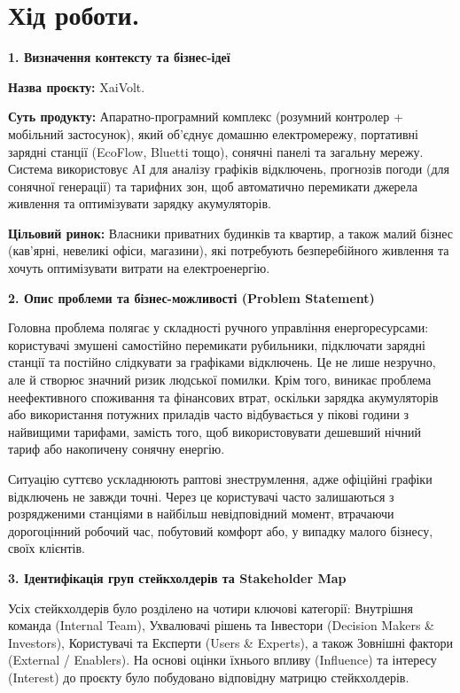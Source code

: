\documentclass[14pt, a4paper]{extreport}
\begin{document}
	\section*{Хід роботи.}
	
	\textbf{1. Визначення контексту та бізнес-ідеї}
	
	\textbf{Назва проєкту:} XaiVolt. 
	
	\textbf{Суть продукту:} Апаратно-програмний комплекс (розумний контролер + мобільний застосунок), який об'єднує домашню електромережу, портативні зарядні станції (EcoFlow, Bluetti тощо), сонячні панелі та загальну мережу. Система використовує AI для аналізу графіків відключень, прогнозів погоди (для сонячної генерації) та тарифних зон, щоб автоматично перемикати джерела живлення та оптимізувати зарядку акумуляторів.
	
	\textbf{Цільовий ринок:} Власники приватних будинків та квартир, а також малий бізнес (кав'ярні, невеликі офіси, магазини), які потребують безперебійного живлення та хочуть оптимізувати витрати на електроенергію.
	
	\textbf{2. Опис проблеми та бізнес-можливості (Problem Statement)}
	
	Головна проблема полягає у складності ручного управління енергоресурсами: користувачі змушені самостійно перемикати рубильники, підключати зарядні станції та постійно слідкувати за графіками відключень. Це не лише незручно, але й створює значний ризик людської помилки. Крім того, виникає проблема неефективного споживання та фінансових втрат, оскільки зарядка акумуляторів або використання потужних приладів часто відбувається у пікові години з найвищими тарифами, замість того, щоб використовувати дешевший нічний тариф або накопичену сонячну енергію. 
	
	Ситуацію суттєво ускладнюють раптові знеструмлення, адже офіційні графіки відключень не завжди точні. Через це користувачі часто залишаються з розрядженими станціями в найбільш невідповідний момент, втрачаючи дорогоцінний робочий час, побутовий комфорт або, у випадку малого бізнесу, своїх клієнтів.
	
	\textbf{3. Ідентифікація груп стейкхолдерів та Stakeholder Map}
	
	Усіх стейкхолдерів було розділено на чотири ключові категорії: Внутрішня команда (Internal Team), Ухвалювачі рішень та Інвестори (Decision Makers \& Investors), Користувачі та Експерти (Users \& Experts), а також Зовнішні фактори (External / Enablers). На основі оцінки їхнього впливу (Influence) та інтересу (Interest) до проєкту було побудовано відповідну матрицю стейкхолдерів.
	
\end{document}
